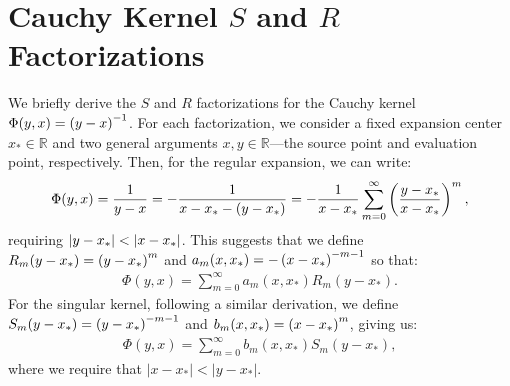 \section{Cauchy Kernel $S$ and $R$ Factorizations}

We briefly derive the $S$
and $R$
factorizations for the Cauchy kernel $\Phi(y, x) = \left(y - x\right)^{-1}$.
For each factorization, we consider a fixed expansion center
$x_* \in \mathbb{R}$
and two general arguments $x, y \in \mathbb{R}$\----the source point and evaluation point, respectively.  Then, for
the regular expansion, we can write:
\begin{align*}
  \Phi(y, x) = {1 \over y - x} = -{1 \over x - x_* - (y - x_*)} = -{1 \over x - x_*} \sum_{m=0}^\infty \left(y - x_* \over x - x_*\right)^m,
\end{align*}
requiring $\left|y - x_*\right| < \left|x - x_*\right|$.
This suggests that we define $R_m(y - x_*) = \left(y - x_*\right)^m$ and $a_m(x, x_*) = -\left(x - x_*\right)^{-m-1}$ so that:
\begin{align*}
  \Phi(y, x) = \sum_{m=0}^\infty a_m(x, x_*) R_m(y - x_*).
\end{align*}
For the singular kernel, following a similar derivation, we define $S_m(y - x_*) = \left(y - x_*\right)^{-m-1}$ and $b_m(x, x_*) = \left(x - x_*\right)^m$, giving us:
\begin{align*}
  \Phi(y, x) = \sum_{m=0}^\infty b_m(x, x_*) S_m(y - x_*),
\end{align*}
where we require that $|x - x_*| < |y - x_*|$. \\

